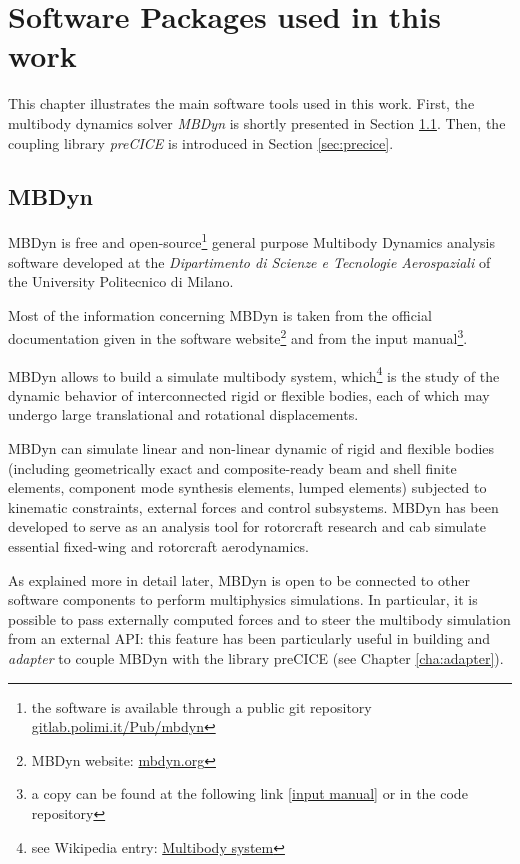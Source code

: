 \chapter{Software Packages used in this work}
\label{cha:software}

This chapter illustrates the main software tools used in this work. First, the multibody dynamics solver \textit{MBDyn}  is shortly presented in Section \ref{sec:mbdyn}. Then, the coupling library \textit{preCICE} is introduced in Section \ref{sec:precice}.


\section{MBDyn}
\label{sec:mbdyn}


MBDyn is free and open-source\footnote{the software is available through a public git repository \href{https://gitlab.polimi.it/Pub/mbdyn}{gitlab.polimi.it/Pub/mbdyn}} general purpose Multibody Dynamics analysis software developed at the \textit{Dipartimento di Scienze e Tecnologie Aerospaziali}  of the University Politecnico di Milano.

Most of the information concerning MBDyn is taken from the official documentation given in the software website\footnote{MBDyn website: \href{https://www.mbdyn.org/}{mbdyn.org}} and from the input manual\footnote{a copy can be found at the following link [\href{https://www.mbdyn.org/userfiles/documents/mbdyn-input-1.7.3.pdf}{input manual}] or in the code repository}.

MBDyn allows to build a simulate multibody system, which\footnote{see Wikipedia entry: \href{https://en.wikipedia.org/wiki/Multibody_system}{Multibody system}} is the study of the dynamic behavior of interconnected rigid or flexible bodies, each of which may undergo large translational and rotational displacements.

MBDyn can simulate linear and non-linear dynamic of rigid and flexible bodies (including geometrically exact and composite-ready beam and shell finite elements, component mode synthesis elements, lumped elements) subjected to kinematic constraints, external forces and control subsystems\cite{masarati2014efficient}. 
MBDyn has been developed to serve as an analysis tool for rotorcraft research and cab simulate essential fixed-wing and rotorcraft aerodynamics.

As explained more in detail later, MBDyn is open to be connected to other software components to perform multiphysics simulations. In particular, it is possible to pass externally computed forces  and to steer the multibody simulation from an external API: this feature has been particularly useful in building and \textit{adapter} to couple MBDyn with the library preCICE (see Chapter \ref{cha:adapter}).

